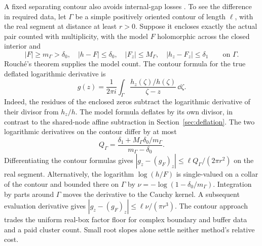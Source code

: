 A fixed separating contour also avoids internal-gap losses
\cite{RTTransfer}. To see the difference in required data, let
\(\Gamma\) be a simple positively oriented contour of length \(\ell\),
with the real segment at distance at least \(r>0\). Suppose it
encloses exactly the actual pair counted with multiplicity, with
the model \(F\) holomorphic across the closed interior and
\[
 |F|\ge m_\Gamma>\delta_0,\quad |h-F|\le\delta_0,\quad
 |F_z|\le M_\Gamma,\quad |h_z-F_z|\le\delta_1
 \qquad\text{on }\Gamma.
\]
Rouch\'e's theorem supplies the model count. The contour formula for
the true deflated logarithmic derivative is
\[
g(z)=\frac{1}{2\pi i}\int_\Gamma
        \frac{h_z(\zeta)/h(\zeta)}{\zeta-z}\,\dd\zeta .
\]
Indeed, the residues of the enclosed zeros subtract the logarithmic
derivative of their divisor from \(h_z/h\). The model formula
deflates by its own divisor, in contrast to the shared-node affine
subtraction in Section~\ref{sec:deflation}. The two logarithmic
derivatives on the contour differ by at most
\[
 Q_\Gamma=\frac{\delta_1+M_\Gamma\delta_0/m_\Gamma}
                   {m_\Gamma-\delta_0}.
\]
Differentiating the contour formulas gives
\(|g_z-(g_F)_z|\le \ell Q_\Gamma/(2\pi r^2)\) on the real segment.
Alternatively, the logarithm \(\log(h/F)\) is single-valued on a
collar of the contour and bounded there on \(\Gamma\) by
\(\nu=-\log(1-\delta_0/m_\Gamma)\). Integration by parts around
\(\Gamma\) moves the derivative to the Cauchy kernel. A subsequent
evaluation derivative gives
\(|g_z-(g_F)_z|\le \ell\nu/(\pi r^3)\).
The contour approach trades the uniform real-box factor floor for
complex boundary and buffer data and a paid cluster count.
Small root slopes alone settle neither method's relative cost.
